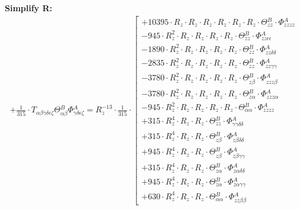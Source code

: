 \documentclass{article}
\begin{document}
\textbf{Simplify R:}
\begin{subequations}\begin{gather}
+ \frac{1}{315} \cdot T_{\alpha{}\beta{}\gamma{}\delta{}\epsilon{}\zeta{}} \Theta{}^{B}_{\alpha{}\beta{}} \Phi{}^{A}_{\gamma{}\delta{}\epsilon{}\zeta{}} = R_{z}^{-13} \cdot \frac{1}{315} \cdot  \left[ \begin{array}{c} 
 		+ 10395 \cdot R_{z} \cdot R_{z} \cdot R_{z} \cdot R_{z} \cdot R_{z} \cdot R_{z} \cdot \Theta{}^{B}_{zz} \cdot \Phi{}^{A}_{zzzz} 
 \\[0.2em] 		 - 945 \cdot R_{z}^{2} \cdot R_{z} \cdot R_{z} \cdot R_{z} \cdot R_{z} \cdot \Theta{}^{B}_{zz} \cdot \Phi{}^{A}_{zz\epsilon{}\epsilon{}} 
 \\[0.2em] 		 - 1890 \cdot R_{z}^{2} \cdot R_{z} \cdot R_{z} \cdot R_{z} \cdot R_{z} \cdot \Theta{}^{B}_{zz} \cdot \Phi{}^{A}_{zz\delta{}\delta{}} 
 \\[0.2em] 		 - 2835 \cdot R_{z}^{2} \cdot R_{z} \cdot R_{z} \cdot R_{z} \cdot R_{z} \cdot \Theta{}^{B}_{zz} \cdot \Phi{}^{A}_{zz\gamma{}\gamma{}} 
 \\[0.2em] 		 - 3780 \cdot R_{z}^{2} \cdot R_{z} \cdot R_{z} \cdot R_{z} \cdot R_{z} \cdot \Theta{}^{B}_{z\beta{}} \cdot \Phi{}^{A}_{zzz\beta{}} 
 \\[0.2em] 		 - 3780 \cdot R_{z}^{2} \cdot R_{z} \cdot R_{z} \cdot R_{z} \cdot R_{z} \cdot \Theta{}^{B}_{z\alpha{}} \cdot \Phi{}^{A}_{zzz\alpha{}} 
 \\[0.2em] 		 - 945 \cdot R_{z}^{2} \cdot R_{z} \cdot R_{z} \cdot R_{z} \cdot R_{z} \cdot \Theta{}^{B}_{\alpha{}\alpha{}} \cdot \Phi{}^{A}_{zzzz} 
 \\[0.2em] 		 + 315 \cdot R_{z}^{4} \cdot R_{z} \cdot R_{z} \cdot \Theta{}^{B}_{zz} \cdot \Phi{}^{A}_{\gamma{}\gamma{}\delta{}\delta{}} 
 \\[0.2em] 		 + 315 \cdot R_{z}^{4} \cdot R_{z} \cdot R_{z} \cdot \Theta{}^{B}_{z\beta{}} \cdot \Phi{}^{A}_{z\beta{}\delta{}\delta{}} 
 \\[0.2em] 		 + 945 \cdot R_{z}^{4} \cdot R_{z} \cdot R_{z} \cdot \Theta{}^{B}_{z\beta{}} \cdot \Phi{}^{A}_{z\beta{}\gamma{}\gamma{}} 
 \\[0.2em] 		 + 315 \cdot R_{z}^{4} \cdot R_{z} \cdot R_{z} \cdot \Theta{}^{B}_{z\alpha{}} \cdot \Phi{}^{A}_{z\alpha{}\delta{}\delta{}} 
 \\[0.2em] 		 + 945 \cdot R_{z}^{4} \cdot R_{z} \cdot R_{z} \cdot \Theta{}^{B}_{z\alpha{}} \cdot \Phi{}^{A}_{z\alpha{}\gamma{}\gamma{}} 
 \\[0.2em] 		 + 630 \cdot R_{z}^{4} \cdot R_{z} \cdot R_{z} \cdot \Theta{}^{B}_{\alpha{}\alpha{}} \cdot \Phi{}^{A}_{zz\beta{}\beta{}} 

\end{array}
\end{gather}
\end{subequations}
\end{document}
